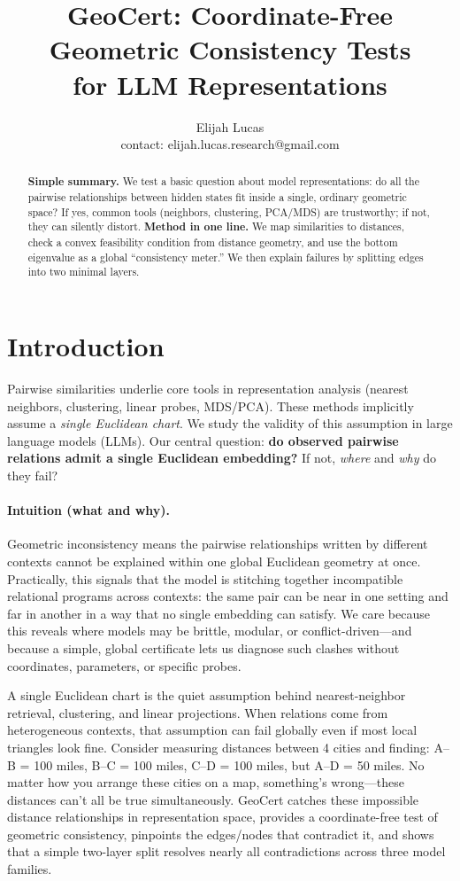 \documentclass[11pt]{article}
\title{GeoCert: Coordinate-Free Geometric Consistency Tests\\
for LLM Representations}
\author{Elijah Lucas\\
\small contact: elijah.lucas.research@gmail.com}
\date{}
\newcommand{\1}{\mathbf{1}}
\begin{document}
\maketitle

\begin{abstract}
\textbf{Simple summary.} We test a basic question about model representations: do all the pairwise relationships between hidden states fit inside a single, ordinary geometric space? If yes, common tools (neighbors, clustering, PCA/MDS) are trustworthy; if not, they can silently distort. \textbf{Method in one line.} We map similarities to distances, check a convex feasibility condition from distance geometry, and use the bottom eigenvalue as a global ``consistency meter.'' We then explain failures by splitting edges into two minimal layers.
\end{abstract}

\vspace{-0.5em}
\section{Introduction}
Pairwise similarities underlie core tools in representation analysis (nearest neighbors, clustering, linear probes, MDS/PCA). These methods implicitly assume a \emph{single Euclidean chart}. We study the validity of this assumption in large language models (LLMs). Our central question: \textbf{do observed pairwise relations admit a single Euclidean embedding?} If not, \emph{where} and \emph{why} do they fail?

\paragraph{Intuition (what and why).} Geometric inconsistency means the pairwise relationships written by different contexts cannot be explained within one global Euclidean geometry at once. Practically, this signals that the model is stitching together incompatible relational programs across contexts: the same pair can be near in one setting and far in another in a way that no single embedding can satisfy. We care because this reveals where models may be brittle, modular, or conflict-driven---and because a simple, global certificate lets us diagnose such clashes without coordinates, parameters, or specific probes.

A single Euclidean chart is the quiet assumption behind nearest-neighbor retrieval, clustering, and linear projections. When relations come from heterogeneous contexts, that assumption can fail globally even if most local triangles look fine. Consider measuring distances between 4 cities and finding: A--B = 100 miles, B--C = 100 miles, C--D = 100 miles, but A--D = 50 miles. No matter how you arrange these cities on a map, something's wrong---these distances can't all be true simultaneously. GeoCert catches these impossible distance relationships in representation space, provides a coordinate-free test of geometric consistency, pinpoints the edges/nodes that contradict it, and shows that a simple two-layer split resolves nearly all contradictions across three model families.
\end{document}
